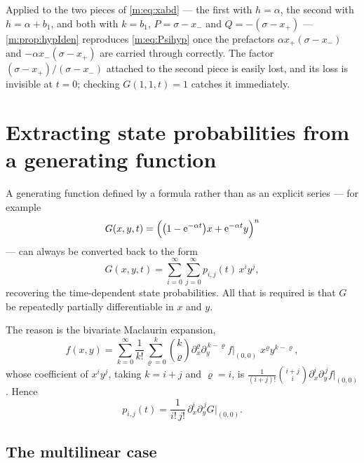 \begin{remark}
Applied to the two pieces of \cref{m:eq:xabd} --- the first with $h=\alpha$, the
second with $h = \alpha+b_1$, and both with $k=b_1$, $P = \sigma-x_-$ and
$Q = -(\sigma-x_+)$ --- \cref{m:prop:hypIden} reproduces \cref{m:eq:Psihyp} once the
prefactors $\alpha x_+(\sigma-x_-)$ and $-\alpha x_-(\sigma-x_+)$ are carried
through correctly. The factor $(\sigma-x_+)/(\sigma-x_-)$ attached to the second
piece is easily lost, and its loss is invisible at $t=0$; checking $G(1,1,t)=1$
catches it immediately.
\end{remark}

\section{Extracting state probabilities from a generating function}
\label{m:app:extract}

A generating function defined by a formula rather than as an explicit series --- for
example
\begin{equation}
\label{m:eq:examplePgf}
G(x,y,t) = \Bigl(\bigl(1-\mathrm{e}^{-\alpha t}\bigr)x + \mathrm{e}^{-\alpha t}y\Bigr)^n
\end{equation}
--- can always be converted back to the form
\begin{equation}
\label{m:eq:series1}
G(x,y,t) = \sum_{i=0}^{\infty}\sum_{j=0}^{\infty}p_{i,j}(t)\,x^iy^j ,
\end{equation}
recovering the time-dependent state probabilities. All that is required is that $G$
be repeatedly partially differentiable in $x$ and $y$.

The reason is the bivariate Maclaurin expansion,
\begin{equation*}
f(x,y) = \sum_{k=0}^{\infty}\frac{1}{k!}\sum_{\varrho=0}^{k}\binom{k}{\varrho}
\partial_x^{\varrho}\partial_y^{\,k-\varrho}f\Big|_{(0,0)}\;x^{\varrho}y^{k-\varrho},
\end{equation*}
whose coefficient of $x^iy^j$, taking $k=i+j$ and $\varrho=i$, is
$\frac{1}{(i+j)!}\binom{i+j}{i}\partial_x^i\partial_y^{\,j}f\big|_{(0,0)}$. Hence
\begin{equation}
\label{m:eq:stateProb}
p_{i,j}(t) = \frac{1}{i!\,j!}\,\partial_x^i\partial_y^{\,j}G\Big|_{(0,0)} .
\end{equation}

\subsection*{The multilinear case}


